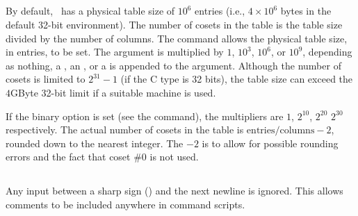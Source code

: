 \subsection{}

By default, \ace\ has a physical table size of $10^6$ entries (i.e., 
  $4 \times 10^6$ bytes in the default 32-bit environment).
The number of cosets in the table is the table size divided by the number
  of columns.
The  command allows the physical table size, in entries, to be
  set.
The argument is multiplied by $1$, $10^3$\kern-2pt, $10^6$\kern-2pt, or 
  $10^9$\kern-2pt, depending as nothing, a , an , or a 
   is appended to the argument.
Although the number of cosets is limited to $2^{31}-1$ (if the C 
  type is 32 bits), the table size can exceed the $4$GByte 32-bit limit if
  a suitable machine is used.

If the binary option is set (see the  command), the multipliers
  are $1$, $2^{10}$\kern-2pt, $2^{20}$ \amp $2^{30}$ respectively.
The actual number of cosets in the table is
  $\mathrm{entries}/\mathrm{columns} -2$, rounded down to the nearest
  integer.
The $-2$ is to allow for possible rounding errors and the fact that coset
  \#0 is not used.

\subsection{}

Any input between a sharp sign (\ttt{\#}) and the next newline is ignored.
This allows comments to be included anywhere in command scripts.

